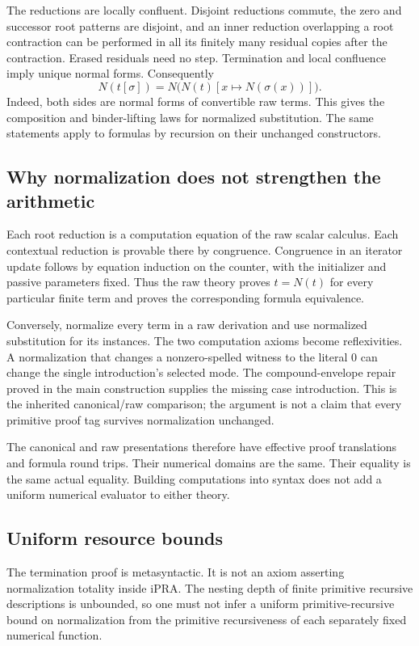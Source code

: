 \documentclass[11pt,letterpaper]{article}
\theoremstyle{definition}
\begin{document}
The reductions are locally confluent.  Disjoint reductions commute, the
zero and successor root patterns are disjoint, and an inner reduction
overlapping a root contraction can be performed in all its finitely many
residual copies after the contraction.  Erased residuals need no step.
Termination and local confluence imply unique normal forms.  Consequently
\[
 N(t[\sigma])=
 N\bigl(N(t)[x\mapsto N(\sigma(x))]\bigr).
 \tag{Coherence}\label{eq:coherence}
\]
Indeed, both sides are normal forms of convertible raw terms.  This gives
the composition and binder-lifting laws for normalized substitution.
The same statements apply to formulas by recursion on their unchanged
constructors.

\subsection{Why normalization does not strengthen the arithmetic}

Each root reduction is a computation equation of the raw scalar calculus.
Each contextual reduction is provable there by congruence.  Congruence in
an iterator update follows by equation induction on the counter, with the
initializer and passive parameters fixed.  Thus the raw theory proves
$t=N(t)$ for every particular finite term and proves the corresponding
formula equivalence.

Conversely, normalize every term in a raw derivation and use normalized
substitution for its instances.  The two computation axioms become
reflexivities.  A normalization that changes a nonzero-spelled witness to
the literal $0$ can change the single introduction's selected mode.  The
compound-envelope repair proved in the main construction supplies the
missing case introduction.  This is the inherited canonical/raw
comparison; the argument is not a claim that every primitive proof tag
survives normalization unchanged.

The canonical and raw presentations therefore have effective proof
translations and formula round trips.  Their numerical domains are the
same.  Their equality is the same actual equality.  Building computations
into syntax does not add a uniform numerical evaluator to either theory.

\subsection{Uniform resource bounds}

The termination proof is metasyntactic.  It is not an axiom asserting
normalization totality inside iPRA.  The nesting depth of finite primitive
recursive descriptions is unbounded, so one must not infer a uniform
primitive-recursive bound on normalization from the primitive recursiveness
of each separately fixed numerical function.
\end{document}
